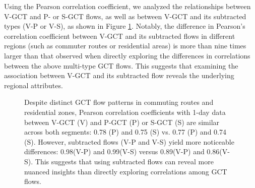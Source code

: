 \documentclass[letterpaper]{article} %
\begin{document}
Using the Pearson correlation coefficient, we analyzed the relationships between V-GCT and P- or S-GCT flows, as well as between V-GCT and its subtracted types (V-P or V-S), as shown in Figure \ref{fig:functionality}. Notably, the difference in Pearson's correlation coefficient between V-GCT and its subtracted flows in different regions (such as commuter routes or residential areas) is more than nine times larger than that observed when directly exploring the differences in correlations between the above multi-type GCT flows. This suggests that examining the association between V-GCT and its subtracted flow reveals the underlying regional attributes.

\begin{figure}
  \centering

  \caption{Despite distinct GCT flow patterns in commuting routes and residential zones, Pearson correlation coefficients with 1-day data between V-GCT (V) and P-GCT (P) or S-GCT (S) are similar across both segments: 0.78 (P) and 0.75 (S) vs. 0.77 (P) and 0.74 (S). However, subtracted flows (V-P and V-S) yield more noticeable differences: 0.98(V-P) and 0.99(V-S) versus 0.89(V-P) and 0.86(V-S). This suggests that using subtracted flows can reveal more nuanced insights than directly exploring correlations among GCT flows.}
  \label{fig:functionality}
\end{figure}
\end{document}
